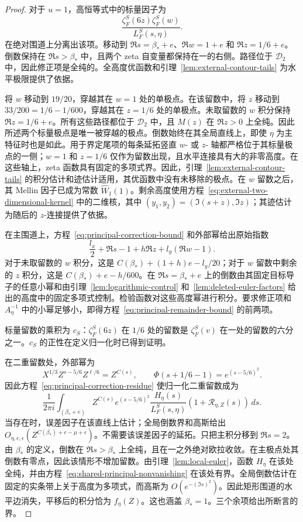 \documentclass[11pt,a4paper]{article}
\numberwithin{equation}{section}
\numberwithin{figure}{section}
\theoremstyle{definition}
\theoremstyle{remark}
\begin{document}
\begin{proof}
对于 $u=1$，高恒等式中的标量因子为
\[
 \frac{\zeta_F^S(6z)\zeta_F^S(w)}{L_F^S(s,\eta)}.
\]
在绝对围道上分离出该项。移动到 $\Re s=\beta_*+e$、$\Re w=1+e$ 和 $\Re z=1/6+e$。倒数保持在 $\Re s>\beta_*$ 中，且两个 zeta 自变量都保持在一的右侧。路径位于 $\mathcal D_2$ 中，因此修正项是全纯的。全高度优函数和引理~\ref{lem:external-contour-tails} 为水平极限提供了依据。

将 $w$ 移动到 $19/20$，穿越其在 $w=1$ 处的单极点。在该留数中，将 $z$ 移动到 $33/200=1/6-1/600$，穿越其在 $z=1/6$ 处的单极点。未取留数的 $w$ 积分保持 $\Re z=1/6+e$。所有这些路径都位于 $\mathcal D_2$ 中，且 $M(z)$ 在 $\Re z>0$ 上全纯。因此所述两个标量极点是唯一被穿越的极点。倒数始终在其全局直线上，即使 $\eta$ 为主特征时也是如此。用于界定尾项的每条延拓竖直 $w$- 或 $z$- 轴都严格位于其标量极点的一侧；$w=1$ 和 $z=1/6$ 仅作为留数出现，且水平连接具有大的非零高度。在这些轴上，zeta 函数具有固定的多项式界。因此，引理~\ref{lem:external-contour-tails} 的积分估计和迹估计适用，其优函数中没有未移除的极点。在 $w$ 留数之后，其 Mellin 因子已成为常数 $\widehat W_1(1)$。剩余高度使用方程~\eqref{eq:external-two-dimensional-kernel} 中的二维核，其中 $(y_1,y_2)=(\Im(s+z),\Im z)$；其迹估计为随后的 $z$-连接提供了依据。

在主围道上，方程~\eqref{eq:principal-correction-bound} 和外部幂给出原始指数
\[
 \frac{l_x}{2}+\Re s-1+h\Re z+l_y(\Re w-1).
\]
对于未取留数的 $w$ 积分，这是 $C(\beta_*)+(1+h)e-l_y/20$；对于 $w$ 留数中剩余的 $z$ 积分，这是 $C(\beta_*)+e-h/600$。在 $\Re s=\beta_*+e$ 上的倒数由其固定目标导子的任意小幂和由引理~\ref{lem:logarithmic-control} 和~\ref{lem:deleted-euler-factors} 给出的高度中的固定多项式控制。检验函数对这些高度幂进行积分。要求修正项和 $A_\eta^{-1}$ 中的小幂足够小，即得方程~\eqref{eq:principal-remainder-bound} 的前两项。

标量留数的乘积为 $c_S$：$\zeta_F^S(6z)$ 在 $1/6$ 处的留数是 $\zeta_F^S(v)$ 在一处的留数的六分之一。$c_S$ 的正性在定义归一化时已得到证明。

在二重留数处，外部幂为
\[
 X^{1/3}Z^{s-5/6}Z^{\ell/6}=Z^{C(s)},
 \qquad \Phi(s+1/6-1)=e^{(s-5/6)^2}.
\]
因此方程~\eqref{eq:principal-correction-residue} 使归一化二重留数成为
\[
 \frac1{2\pi i}\int_{(\beta_*+e)}
 Z^{C(s)}e^{(s-5/6)^2}\frac{H_\eta(s)}{L_F^S(s,\eta)}
          (1+\mathcal R_{\eta,Z}(s))\,ds.
\]
当存在时，误差因子在该直线上估计；全局倒数界和高斯给出 $O_{\eta,e,\epsilon}(Z^{C(\beta_*)+e-\mu+\epsilon})$。不需要该误差因子的延拓。只把主积分移到 $\Re s=2$。由 $\beta_*$ 的定义，倒数在 $\Re s>\beta_*$ 上全纯，且在一之外绝对欧拉收敛。在主极点处其倒数有零点，因此该情形不增加留数。由引理~\ref{lem:local-euler}，函数 $H_\eta$ 在该处全纯，并由方程~\eqref{eq:shared-principal-nonvanishing} 在该处有界。全局倒数估计在固定的实条带上关于高度为多项式，而高斯为 $O(e^{-(\Im s)^2})$。因此矩形围道的水平边消失，平移后的积分恰为 $f_\eta(Z)$。这也涵盖 $\beta_*=1$。三个余项给出所断言的界。
\end{proof}
\end{document}
